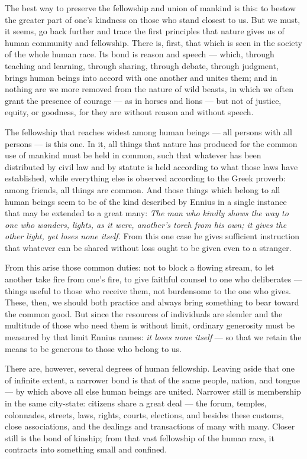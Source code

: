  The best way to preserve the fellowship and union of mankind is this: to bestow the greater part of one's kindness on those who stand closest to us. But we must, it seems, go back further and trace the first principles that nature gives us of human community and fellowship. There is, first, that which is seen in the society of the whole human race. Its bond is reason and speech — which, through teaching and learning, through sharing, through debate, through judgment, brings human beings into accord with one another and unites them; and in nothing are we more removed from the nature of wild beasts, in which we often grant the presence of courage — as in horses and lions — but not of justice, equity, or goodness, for they are without reason and without speech.

 The fellowship that reaches widest among human beings — all persons with all persons — is this one. In it, all things that nature has produced for the common use of mankind must be held in common, such that whatever has been distributed by civil law and by statute is held according to what those laws have established, while everything else is observed according to the Greek proverb: among friends, all things are common. And those things which belong to all human beings seem to be of the kind described by Ennius in a single instance that may be extended to a great many: \textit{The man who kindly shows the way to one who wanders, lights, as it were, another's torch from his own; it gives the other light, yet loses none itself.} From this one case he gives sufficient instruction that whatever can be shared without loss ought to be given even to a stranger.

 From this arise those common duties: not to block a flowing stream, to let another take fire from one's fire, to give faithful counsel to one who deliberates — things useful to those who receive them, not burdensome to the one who gives. These, then, we should both practice and always bring something to bear toward the common good. But since the resources of individuals are slender and the multitude of those who need them is without limit, ordinary generosity must be measured by that limit Ennius names: \textit{it loses none itself} — so that we retain the means to be generous to those who belong to us.

 There are, however, several degrees of human fellowship. Leaving aside that one of infinite extent, a narrower bond is that of the same people, nation, and tongue — by which above all else human beings are united. Narrower still is membership in the same city-state: citizens share a great deal — the forum, temples, colonnades, streets, laws, rights, courts, elections, and besides these customs, close associations, and the dealings and transactions of many with many. Closer still is the bond of kinship; from that vast fellowship of the human race, it contracts into something small and confined.

